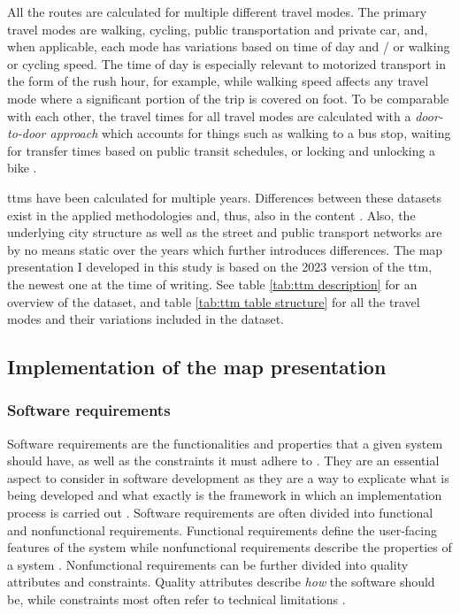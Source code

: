 All the routes are calculated for multiple different travel modes.
The primary travel modes are walking, cycling, public transportation and private car,
and, when applicable, each mode has variations based on
time of day and / or walking or cycling speed.
The time of day is especially relevant to motorized transport
in the form of the rush hour, for example,
while walking speed affects any travel mode
where a significant portion of the trip is covered on foot.
To be comparable with each other,
the travel times for all travel modes are
calculated with a \textit{door-to-door approach}
which accounts for things such as walking to a bus stop,
waiting for transfer times based on public transit schedules,
or locking and unlocking a bike \parencite{ten2020}.

\acrshort{ttm}s have been calculated for multiple years.
Differences between these datasets exist in the applied methodologies
and, thus, also in the content \parencite{ten2020}.
Also, the underlying city structure as well as the street and public transport networks
are by no means static over the years
which further introduces differences.
The map presentation I developed in this study
is based on the 2023 version of the \acrshort{ttm},
the newest one at the time of writing.
See table \ref{tab:ttm description} for an overview of the dataset,
and table \ref{tab:ttm table structure} for all the travel modes and
their variations included in the dataset.







\subsection{Implementation of the map presentation}

\subsubsection{Software requirements}
\label{sec:software req}

Software requirements are the functionalities and properties
that a given system should have,
as well as the constraints it must adhere to \parencite{chu2009}.
They are an essential aspect to consider in software development
as they are a way to explicate
what is being developed and what exactly is the framework
in which an implementation process is carried out \parencite{saq2020}.
Software requirements are often divided into
functional and nonfunctional requirements.
Functional requirements define the user-facing features of the system
while nonfunctional requirements describe the properties of a system
\parencite{chu2009}.
Nonfunctional requirements can be further divided into
quality attributes and constraints.
Quality attributes describe \textit{how} the software should be,
while constraints most often refer to technical limitations \parencite{chu2009}.


